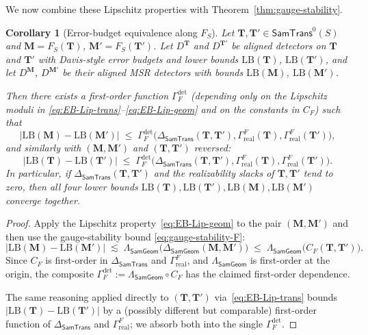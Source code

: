 \documentclass[11pt]{article}
\newtheorem{corollary}{Corollary}
\newcommand{\SamTrans}{\mathsf{SamTrans}}
\newcommand{\SamGeom}{\mathsf{SamGeom}}
\begin{document}
We now combine these Lipschitz properties with
Theorem~\ref{thm:gauge-stability}.

\begin{corollary}[Error-budget equivalence along $F_S$]
\label{cor:EB-F}
Let $\mathbf{T},\mathbf{T}' \in \SamTrans^0(S)$ and
$\mathbf{M} = F_S(\mathbf{T})$,
$\mathbf{M}' = F_S(\mathbf{T}')$. Let $D^{\mathbf{T}}$ and
$D^{\mathbf{T}'}$ be aligned detectors on $\mathbf{T}$ and $\mathbf{T}'$
with Davis-style error budgets and lower bounds $\mathrm{LB}(\mathbf{T})$,
$\mathrm{LB}(\mathbf{T}')$, and let $D^{\mathbf{M}}$,
$D^{\mathbf{M}'}$ be their aligned MSR detectors with bounds
$\mathrm{LB}(\mathbf{M})$, $\mathrm{LB}(\mathbf{M}')$.

Then there exists a first-order function
$\Gamma_F^{\mathrm{det}}$ (depending only on the Lipschitz moduli in
\eqref{eq:EB-Lip-trans}–\eqref{eq:EB-Lip-geom} and on the constants in
$C_F$) such that
\[
\bigl|
\mathrm{LB}(\mathbf{M}) - \mathrm{LB}(\mathbf{M}')
\bigr|
\;\le\;
\Gamma_F^{\mathrm{det}}\bigl(
\Delta_{\SamTrans}(\mathbf{T},\mathbf{T}'),
\Gamma_{\mathrm{real}}^{F}(\mathbf{T}),
\Gamma_{\mathrm{real}}^{F}(\mathbf{T}')
\bigr),
\]
and similarly with $(\mathbf{M},\mathbf{M}')$ and
$(\mathbf{T},\mathbf{T}')$ reversed:
\[
\bigl|
\mathrm{LB}(\mathbf{T}) - \mathrm{LB}(\mathbf{T}')
\bigr|
\;\le\;
\Gamma_F^{\mathrm{det}}\bigl(
\Delta_{\SamTrans}(\mathbf{T},\mathbf{T}'),
\Gamma_{\mathrm{real}}^{F}(\mathbf{T}),
\Gamma_{\mathrm{real}}^{F}(\mathbf{T}')
\bigr).
\]
In particular, if $\Delta_{\SamTrans}(\mathbf{T},\mathbf{T}')$ and the
realizability slacks of $\mathbf{T},\mathbf{T}'$ tend to zero, then all
four lower bounds
$\mathrm{LB}(\mathbf{T}),\mathrm{LB}(\mathbf{T}'),
 \mathrm{LB}(\mathbf{M}),\mathrm{LB}(\mathbf{M}')$
converge together.
\end{corollary}

\begin{proof}
Apply the Lipschitz property~\eqref{eq:EB-Lip-geom} to the pair
$(\mathbf{M},\mathbf{M}')$ and then use the gauge-stability bound
\eqref{eq:gauge-stability-F}:
\[
\bigl|
\mathrm{LB}(\mathbf{M}) - \mathrm{LB}(\mathbf{M}')
\bigr|
\;\lesssim\;
\Lambda_{\SamGeom}\bigl(
\Delta_{\SamGeom}(\mathbf{M},\mathbf{M}')
\bigr)
\;\le\;
\Lambda_{\SamGeom}\bigl(
C_F(\mathbf{T},\mathbf{T}')
\bigr).
\]
Since $C_F$ is first-order in
$\Delta_{\SamTrans}$ and $\Gamma_{\mathrm{real}}^{F}$, and
$\Lambda_{\SamGeom}$ is first-order at the origin, the composite
$\Gamma_F^{\mathrm{det}} := \Lambda_{\SamGeom} \circ C_F$ has the
claimed first-order dependence.

The same reasoning applied directly to
$(\mathbf{T},\mathbf{T}')$ via~\eqref{eq:EB-Lip-trans} bounds
$|\mathrm{LB}(\mathbf{T}) - \mathrm{LB}(\mathbf{T}')|$ by a (possibly
different but comparable) first-order function of
$\Delta_{\SamTrans}$ and $\Gamma_{\mathrm{real}}^{F}$; we absorb both
into the single $\Gamma_F^{\mathrm{det}}$.
\end{proof}
\end{document}
